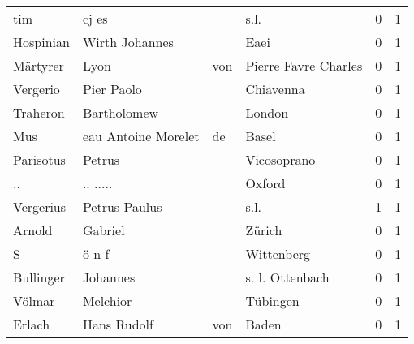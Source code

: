 \begin{center}
\begin{tiny}
\begin{longtabu}{llllrr}
                      tim &                              cj es &             &                                        s.l. &          0 &         1 \\
                Hospinian &                     Wirth Johannes &             &                                        Eaei &          0 &         1 \\
                 Märtyrer &                               Lyon &         von &                        Pierre Favre Charles &          0 &         1 \\
                 Vergerio &                         Pier Paolo &             &                                   Chiavenna &          0 &         1 \\
                 Traheron &                        Bartholomew &             &                                      London &          0 &         1 \\
                      Mus &                eau Antoine Morelet &          de &                                       Basel &          0 &         1 \\
                Parisotus &                             Petrus &             &                                 Vicosoprano &          0 &         1 \\
                       .. &                           .. ..... &             &                                      Oxford &          0 &         1 \\
                Vergerius &                      Petrus Paulus &             &                                        s.l. &          1 &         1 \\
                   Arnold &                            Gabriel &             &                                      Zürich &          0 &         1 \\
                        S &                              ö n f &             &                                  Wittenberg &          0 &         1 \\
                Bullinger &                           Johannes &             &                             s. l. Ottenbach &          0 &         1 \\
                   Völmar &                           Melchior &             &                                    Tübingen &          0 &         1 \\
                   Erlach &                        Hans Rudolf &         von &                                       Baden &          0 &         1 \\

\end{longtabu}
\end{tiny}
\end{center}
